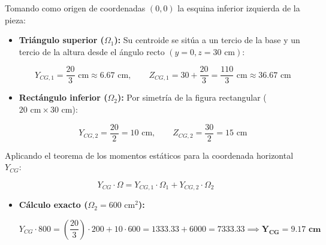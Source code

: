 {    



    Tomando como origen de coordenadas $(0,0)$ la esquina inferior izquierda de la pieza:

    \begin{itemize}

        \item \textbf{Triángulo superior ($\Omega_1$):} Su centroide se sitúa a un tercio de la base y un tercio de la altura desde el ángulo recto $(y=0, z=30\text{ cm})$:

              \begin{equation}
                  Y_{CG,1} = \frac{20}{3}\text{ cm} \approx 6.67\text{ cm}, \qquad Z_{CG,1} = 30 + \frac{20}{3} = \frac{110}{3}\text{ cm} \approx 36.67\text{ cm}
\end{equation}

        \item \textbf{Rectángulo inferior ($\Omega_2$):} Por simetría de la figura rectangular ($20\text{ cm} \times 30\text{ cm}$):

              \begin{equation}
                  Y_{CG,2} = \frac{20}{2} = 10\text{ cm}, \qquad Z_{CG,2} = \frac{30}{2} = 15\text{ cm}
\end{equation}

    \end{itemize}






    Aplicando el teorema de los momentos estáticos para la coordenada horizontal $Y_{CG}$:

    \begin{equation}
        Y_{CG} \cdot \Omega = Y_{CG,1} \cdot \Omega_1 + Y_{CG,2} \cdot \Omega_2
\end{equation}

    \begin{itemize}

        \item \textbf{Cálculo exacto ($\Omega_2 = 600\text{ cm}^2$):}

              \begin{equation}
                  Y_{CG} \cdot 800 = \left(\frac{20}{3}\right) \cdot 200 + 10 \cdot 600 = 1333.33 + 6000 = 7333.33 \implies \mathbf{Y_{CG} = 9.17\text{ cm}}
\end{equation}


\end{itemize}}
